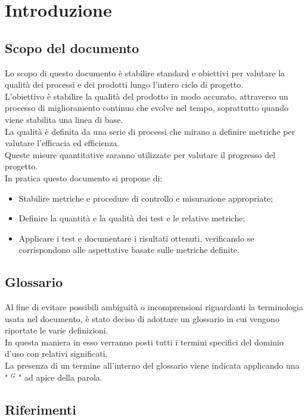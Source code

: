 \nonstopmode

\section{Introduzione}
\subsection{Scopo del documento}
Lo scopo di questo documento è stabilire standard e obiettivi per valutare la qualità
dei processi e dei prodotti lungo l'intero ciclo di progetto. \\
L'obiettivo è stabilire la qualità del prodotto in modo accurato, attraverso un processo di miglioramento continuo che evolve nel tempo, soprattutto quando viene stabilita
una linea di base. \\
La qualità è definita da una serie di processi che mirano a definire metriche per valutare
l'efficacia ed efficienza. \\
Queste misure quantitative saranno utilizzate per valutare il progresso del progetto.\\
In pratica questo documento si propone di:
\begin{itemize}
    \item Stabilire metriche e procedure di controllo e misurazione appropriate;
    \item Definire la quantità e la qualità dei test e le relative metriche;
    \item Applicare i test e documentare i risultati ottenuti, verificando se corrispondono alle aspettative basate sulle metriche definite.
\end{itemize}

\subsection{Glossario}
Al fine di evitare possibili ambiguità o incomprensioni riguardanti la terminologia usata nel documento, è stato deciso di adottare un glossario in cui vengono riportate le varie definizioni. \\
In questa maniera in esso verranno posti tutti i termini specifici del dominio d’uso con relativi significati. \\
La presenza di un termine all’interno del glossario viene indicata applicando una " $^{G}$ " ad apice della parola.
\subsection{Riferimenti}
